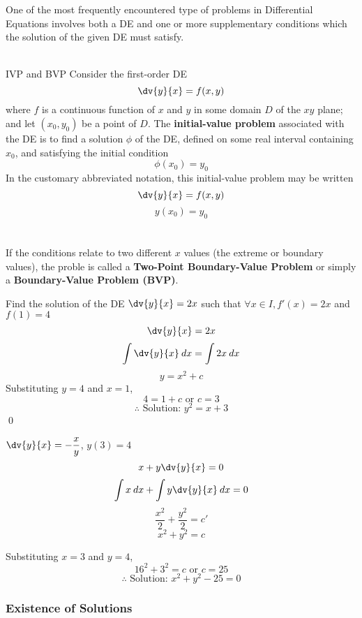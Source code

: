 One of the most frequently encountered type of problems in Differential Equations involves both a DE and one or more supplementary conditions which the solution of the given DE must satisfy. \\~\\

\begin{definition}{IVP and BVP}{}
    Consider the first-order DE \[
        \dv{y}{x} = f(x,y)
    \] where $f$ is a continuous function of $x$ and $y$ in some domain $D$ of the $xy$ plane; and let $(x_0,y_0)$ be a point of $D$. The \textbf{initial-value problem} associated with the DE is to find a solution $\phi$ of the DE, defined on some real interval containing $x_0$, and satisfying the initial condition \[
        \phi(x_0) = y_0
    \] In the customary abbreviated notation, this initial-value problem may be written \[
        \dv{y}{x} = f(x,y)
    \] \[
        y(x_0) = y_0
    \] \\~\\

    If the conditions relate to two different $x$ values (the extreme or boundary values), the proble is called a \textbf{Two-Point Boundary-Value Problem} or simply a \textbf{Boundary-Value Problem (BVP)}.
\end{definition}

\begin{example}{Find the solution of the DE $\dv{y}{x} = 2x$ such that $\forall x\in I, f'(x) = 2x$ and  $f(1)=4$}{}
    \[ \dv{y}{x} = 2x \]
    \[ \int {\dv{y}{x}} \: d{x} = \int {2x} \: d{x} \]
    \[ y = x^2 + c \]
    Substituting $y=4$ and $x=1$,
    \[ 4 = 1 + c \text{ or } c = 3 \]
    \[ \therefore \text{ Solution: } y^2 = x + 3 \] \qed
\end{example}

\begin{example}{$\dv{y}{x} = -\dfrac{x}{y}$, $y(3)=4$}{}
    \[ x + y \dv{y}{x} = 0 \]
    \[ \int{x} \: d{x} + \int{y \dv{y}{x}} \: d{x} = 0 \]
    \[ \frac{x^2}{2} + \frac{y^2}{2} = c' \]
    \[ x^2 + y^2 = c \]

    Substituting $x=3$ and $y=4$,
    \[ 16^2 + 3^2 = c \text{ or } c = 25 \]
    \[ \therefore \text{ Solution: } x^2 + y^2 - 25 = 0 \]
\end{example}


\subsubsection{Existence of Solutions}

